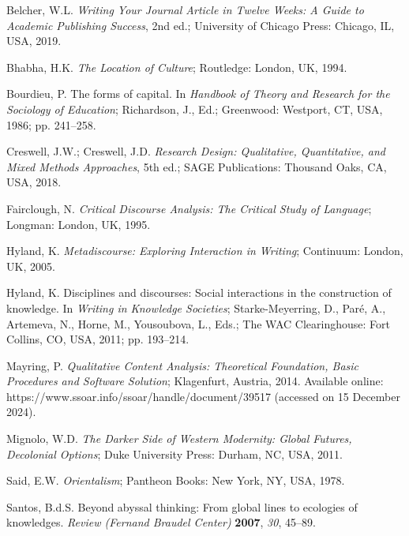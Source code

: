 \documentclass[journal,article,submit,pdftex,moreauthors]{Definitions/mdpi}
\begin{document}


\begin{thebibliography}{999}

 Belcher, W.L. \textit{Writing Your Journal Article in Twelve Weeks: A Guide to Academic Publishing Success}, 2nd ed.; University of Chicago Press: Chicago, IL, USA, 2019.

 Bhabha, H.K. \textit{The Location of Culture}; Routledge: London, UK, 1994.

 Bourdieu, P. The forms of capital. In \textit{Handbook of Theory and Research for the Sociology of Education}; Richardson, J., Ed.; Greenwood: Westport, CT, USA, 1986; pp. 241--258.

 Creswell, J.W.; Creswell, J.D. \textit{Research Design: Qualitative, Quantitative, and Mixed Methods Approaches}, 5th ed.; SAGE Publications: Thousand Oaks, CA, USA, 2018.

 Fairclough, N. \textit{Critical Discourse Analysis: The Critical Study of Language}; Longman: London, UK, 1995.

 Hyland, K. \textit{Metadiscourse: Exploring Interaction in Writing}; Continuum: London, UK, 2005.

 Hyland, K. Disciplines and discourses: Social interactions in the construction of knowledge. In \textit{Writing in Knowledge Societies}; Starke-Meyerring, D., Paré, A., Artemeva, N., Horne, M., Yousoubova, L., Eds.; The WAC Clearinghouse: Fort Collins, CO, USA, 2011; pp. 193--214.

 Mayring, P. \textit{Qualitative Content Analysis: Theoretical Foundation, Basic Procedures and Software Solution}; Klagenfurt, Austria, 2014. Available online: https://www.ssoar.info/ssoar/handle/document/39517 (accessed on 15 December 2024).

 Mignolo, W.D. \textit{The Darker Side of Western Modernity: Global Futures, Decolonial Options}; Duke University Press: Durham, NC, USA, 2011.

 Said, E.W. \textit{Orientalism}; Pantheon Books: New York, NY, USA, 1978.

 Santos, B.d.S. Beyond abyssal thinking: From global lines to ecologies of knowledges. \textit{Review (Fernand Braudel Center)} \textbf{2007}, \textit{30}, 45--89.


\end{thebibliography}
\end{document}
